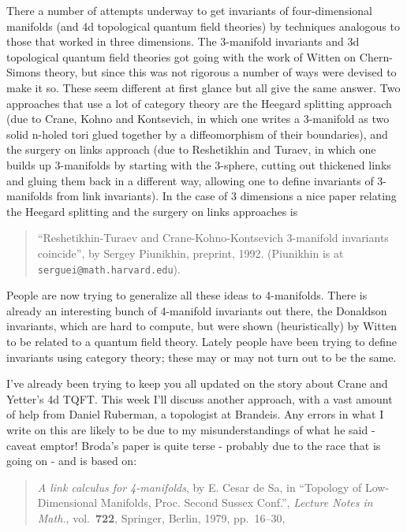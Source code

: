 \documentclass{article}
\begin{document}
There a number of attempts underway to get invariants of
four-dimensional manifolds (and 4d topological quantum field theories)
by techniques analogous to those that worked in three dimensions. The
3-manifold invariants and 3d topological quantum field theories got
going with the work of Witten on Chern-Simons theory, but since this was
not rigorous a number of ways were devised to make it so. These seem
different at first glance but all give the same answer. Two approaches
that use a lot of category theory are the Heegard splitting approach
(due to Crane, Kohno and Kontsevich, in which one writes a 3-manifold as
two solid n-holed tori glued together by a diffeomorphism of their
boundaries), and the surgery on links approach (due to Reshetikhin and
Turaev, in which one builds up 3-manifolds by starting with the
3-sphere, cutting out thickened links and gluing them back in a
different way, allowing one to define invariants of 3-manifolds from
link invariants). In the case of 3 dimensions a nice paper relating the
Heegard splitting and the surgery on links approaches is

\begin{quote}
``Reshetikhin-Turaev and Crane-Kohno-Kontsevich 3-manifold invariants
coincide'', by Sergey Piunikhin, preprint, 1992. (Piunikhin is at
\texttt{serguei@math.harvard.edu}).
\end{quote}

People are now trying to generalize all these ideas to 4-manifolds.
There is already an interesting bunch of 4-manifold invariants out
there, the Donaldson invariants, which are hard to compute, but were
shown (heuristically) by Witten to be related to a quantum field theory.
Lately people have been trying to define invariants using category
theory; these may or may not turn out to be the same.

I've already been trying to keep you all updated on the story about
Crane and Yetter's 4d TQFT. This week I'll discuss another approach,
with a vast amount of help from Daniel Ruberman, a topologist at
Brandeis. Any errors in what I write on this are likely to be due to my
misunderstandings of what he said - caveat emptor! Broda's paper is
quite terse - probably due to the race that is going on - and is based
on:

\begin{quote}
\emph{A link calculus for 4-manifolds}, by E. Cesar de Sa, in ``Topology
of Low-Dimensional Manifolds, Proc. Second Sussex Conf.'', \emph{Lecture
Notes in Math.}, vol.~\textbf{722}, Springer, Berlin, 1979, pp.~16--30,
\end{quote}
\end{document}
